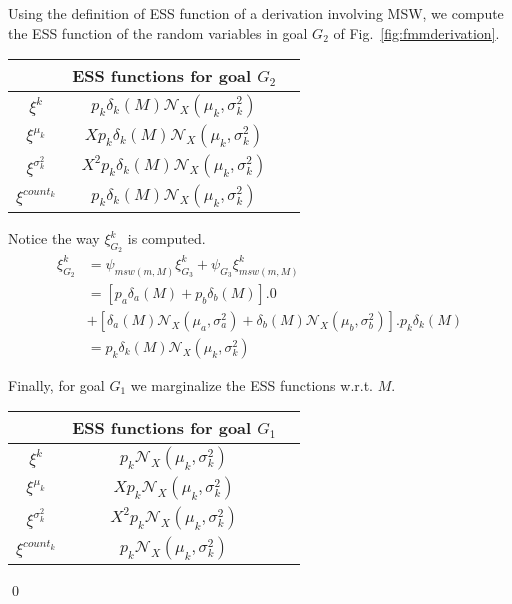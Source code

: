 \begin{Ex}
Using the definition of ESS function of a derivation involving MSW, we compute the ESS function 
of the random variables in goal $G_{2}$ of Fig.~\ref{fig:fmmderivation}.
 \begin{center}
\begin{tabular}{|c|c|c|}
  \hline
  &  ESS functions for goal $G_{2}$ \\ \hline
  $\xi^{k}$ & $ p_{k} \delta_{k}(M) \mathcal{N}_{X}(\mu_{k}, \sigma^{2}_{k})$  \\ \hline
  $\xi^{\mu_{k}}$ & $X p_{k} \delta_{k}(M) \mathcal{N}_{X}(\mu_{k}, \sigma^{2}_{k})$  \\ \hline
  $\xi^{\sigma^{2}_{k}}$ & $X^{2} p_{k} \delta_{k}(M) \mathcal{N}_{X}(\mu_{k}, \sigma^{2}_{k})$  \\ \hline
  $\xi^{count_{k}}$ & $p_{k} \delta_{k}(M) \mathcal{N}_{X}(\mu_{k}, \sigma^{2}_{k})$  \\ \hline
\end{tabular}
\end{center}
Notice the way $\xi^{k}_{G_{2}}$ is computed. 
\begin{align*}
\xi^{k}_{G_{2}} &= \psi_{msw(m, M)} \xi^{k}_{G_{3}} + \psi_{G_{3}} \xi^{k}_{msw(m,M)}\\
&= [p_{a} \delta_{a}(M) + p_{b} \delta_{b}(M)]. 0 \\&+  [\delta_{a}(M)
  \mathcal{N}_{X}(\mu_{a}, \sigma^{2}_{a}) + \delta_{b}(M) \mathcal{N}_{X}(\mu_{b}, \sigma^{2}_{b})].  p_{k} \delta_{k}(M)\\
&= p_{k} \delta_{k}(M) \mathcal{N}_{X}(\mu_{k}, \sigma^{2}_{k})
\end{align*}

Finally, for goal $G_{1}$ we marginalize the ESS functions w.r.t. $M$. 
\begin{center}
\begin{tabular}{|c|c|c|}
  \hline
  &  ESS functions for goal $G_{1}$ \\ \hline
  $\xi^{k}$ & $ p_{k} \mathcal{N}_{X}(\mu_{k}, \sigma^{2}_{k})$  \\ \hline
  $\xi^{\mu_{k}}$ & $X p_{k}  \mathcal{N}_{X}(\mu_{k}, \sigma^{2}_{k})$  \\ \hline
  $\xi^{\sigma^{2}_{k}}$ & $X^{2} p_{k}  \mathcal{N}_{X}(\mu_{k}, \sigma^{2}_{k})$  \\ \hline
  $\xi^{count_{k}}$ & $p_{k}  \mathcal{N}_{X}(\mu_{k}, \sigma^{2}_{k})$  \\ \hline
\end{tabular}
\end{center}\qed
\end{Ex}

